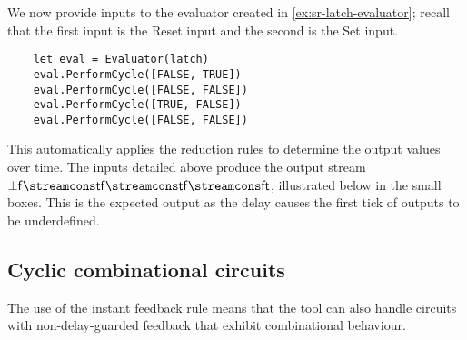 \begin{example}
  We now provide inputs to the evaluator created in
  \cref{ex:sr-latch-evaluator}; recall that the first input is the
  \textsf{R}eset input and the second is the \textsf{S}et input.
  \begin{lstlisting}
    let eval = Evaluator(latch)
    eval.PerformCycle([FALSE, TRUE])
    eval.PerformCycle([FALSE, FALSE])
    eval.PerformCycle([TRUE, FALSE])
    eval.PerformCycle([FALSE, FALSE])
  \end{lstlisting}
  This automatically applies the reduction rules to determine the output values
  over time.
  The inputs detailed above produce the output stream \(
  \bot\mathsf{f} \streamcons \mathsf{t}\mathsf{f} \streamcons
  \mathsf{t}\mathsf{f} \streamcons \mathsf{f}\mathsf{t}
  \), illustrated below in the small boxes.
  This is the expected output as the delay causes the first tick of outputs to
  be underdefined.
  \begin{center}
    
  \end{center}
\end{example}

\subsection{Cyclic combinational circuits}

The use of the instant feedback rule means that the tool can also handle
circuits with non-delay-guarded feedback that exhibit combinational behaviour.

